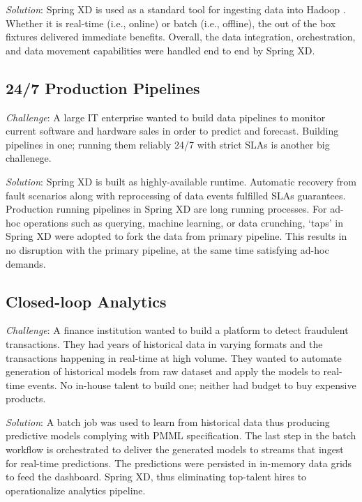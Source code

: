\textit{Solution}: Spring XD is used as a standard tool for ingesting data 
into Hadoop . Whether it is real-time (i.e., online) or batch 
(i.e., offline),
the out of the box fixtures delivered immediate benefits. Overall, the data
integration, orchestration, and data movement capabilities were handled end
to end by Spring XD.

\subsection{24/7 Production Pipelines}
\textit{Challenge}: A large IT enterprise wanted to build data pipelines to
monitor current software and hardware sales in order to predict and forecast.
Building pipelines in one; running them reliably 24/7 with strict SLAs is
another big challenege.

\textit{Solution}: Spring XD is built as highly-available runtime. Automatic
recovery from fault scenarios along with reprocessing of data events fulfilled
SLAs guarantees. Production running pipelines in Spring XD are long running
processes. For ad-hoc operations such as querying, machine learning, or
data crunching, `taps' in Spring XD were adopted to fork the data from primary
pipeline. This results in no disruption with the primary pipeline, at the
same time satisfying ad-hoc demands.

\subsection{Closed-loop Analytics}
\textit{Challenge}: A finance institution wanted to build a platform to detect
fraudulent transactions. They had years of historical data in varying formats
and the transactions happening in real-time at high volume. They wanted to
automate generation of historical models from raw dataset and apply the models
to real-time events. No in-house talent to build one; neither had budget to buy
expensive products.

\textit{Solution}: A batch job was used to learn from historical data thus
producing predictive models complying with PMML specification. The last step
in the batch workflow is orchestrated to deliver the generated models to
streams that ingest for real-time predictions. The predictions were persisted
in in-memory data grids to feed the dashboard. Spring XD, thus eliminating
top-talent hires to operationalize analytics pipeline.
